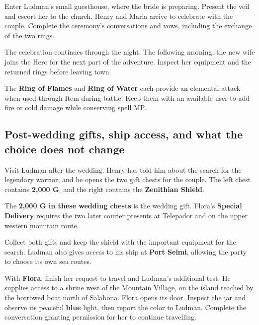 Enter Ludman's small guesthouse, where the bride is preparing. Present
the veil and escort her to the church. Henry and Maria arrive to
celebrate with the couple. Complete the ceremony's conversations and
vows, including the exchange of the two rings.


The celebration continues through the night. The following morning,
the new wife joins the Hero for the next part of the adventure.
Inspect her equipment and the returned rings before leaving town.

The \textbf{Ring of Flames} and \textbf{Ring of Water} each
provide an elemental attack when used through Item during battle.
Keep them with an available user to add fire or cold damage
while conserving spell MP.

\subsection{Post-wedding gifts, ship access, and what the choice does not change}

Visit Ludman after the wedding. Henry has told him about the search
for the legendary warrior, and he opens the two gift chests for the
couple. The left chest contains \textbf{2,000 G}, and the right
contains the \textbf{Zenithian Shield}.

The \textbf{2,000 G in these wedding chests} is the wedding gift. Flora's
\textbf{Special Delivery} requires the two later courier presents at
Telepador and on the upper western mountain route.

Collect both gifts and keep the shield with the important equipment
for the search. Ludman also gives access to his ship at
\textbf{Port Selmi}, allowing the party to choose its own sea routes.

With \textbf{Flora}, finish her request to travel and Ludman's
additional test. He supplies access to a shrine west of the Mountain
Village, on the island reached by the borrowed boat north of Salabona.
Flora opens its door. Inspect the jar and observe its peaceful
\textbf{blue} light, then report the color to Ludman. Complete the
conversation granting permission for her to continue travelling.



